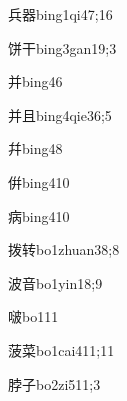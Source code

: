 \begin{verbete}{兵器}{bing1qi4}{7;16}
\end{verbete}

\begin{verbete}{饼干}{bing3gan1}{9;3}
\end{verbete}

\begin{verbete}{并}{bing4}{6}
\end{verbete}

\begin{verbete}{并且}{bing4qie3}{6;5}
\end{verbete}

\begin{verbete}{幷}{bing4}{8}
\end{verbete}

\begin{verbete}{倂}{bing4}{10}
\end{verbete}

\begin{verbete}{病}{bing4}{10}
\end{verbete}

\begin{verbete}{拨转}{bo1zhuan3}{8;8}
\end{verbete}

\begin{verbete}{波音}{bo1yin1}{8;9}
\end{verbete}

\begin{verbete}{啵}{bo1}{11}
\end{verbete}

\begin{verbete}{菠菜}{bo1cai4}{11;11}
\end{verbete}

\begin{verbete}{脖子}{bo2zi5}{11;3}
\end{verbete}


